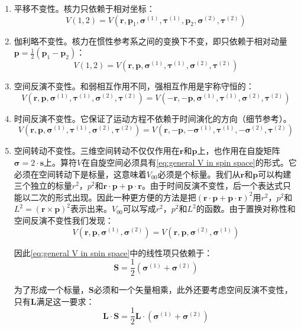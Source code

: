 \begin{enumerate}
\item 平移不变性。核力只依赖于相对坐标：
\[
V(1,2)=V(\boldsymbol{r},\boldsymbol{p}_{1},\boldsymbol{\sigma}^{(1)},\boldsymbol{\tau}^{(1)},\boldsymbol{p}_{2},\boldsymbol{\sigma}^{(2)},\boldsymbol{\tau}^{(2)})
\]
\item 伽利略不变性。核力在惯性参考系之间的变换下不变，即只依赖于相对动量$\boldsymbol{p}=\frac{1}{2}(\boldsymbol{p}_{1}-\boldsymbol{p}_{2})$：
\[
V(1,2)=V(\boldsymbol{r},\boldsymbol{p},\boldsymbol{\sigma}^{(1)},\boldsymbol{\tau}^{(1)},\boldsymbol{\sigma}^{(2)},\boldsymbol{\tau}^{(2)})
\]
\item 空间反演不变性。和弱相互作用不同，强相互作用是宇称守恒的：
\[
V(\boldsymbol{r},\boldsymbol{p},\boldsymbol{\sigma}^{(1)},\boldsymbol{\tau}^{(1)},\boldsymbol{\sigma}^{(2)},\boldsymbol{\tau}^{(2)})=V(-\boldsymbol{r},-\boldsymbol{p},\boldsymbol{\sigma}^{(1)},\boldsymbol{\tau}^{(1)},\boldsymbol{\sigma}^{(2)},\boldsymbol{\tau}^{(2)})
\]
\item 时间反演不变性。它保证了运动方程不依赖于时间演化的方向（细节参考\cite{Me61}）。
\[
V(\boldsymbol{r},\boldsymbol{p},\boldsymbol{\sigma}^{(1)},\boldsymbol{\tau}^{(1)},\boldsymbol{\sigma}^{(2)},\boldsymbol{\tau}^{(2)})=V(\boldsymbol{r},-\boldsymbol{p},-\boldsymbol{\sigma}^{(1)},\boldsymbol{\tau}^{(1)},-\boldsymbol{\sigma}^{(2)},\boldsymbol{\tau}^{(2)})
\]
\item 空间转动不变性。三维空间转动不仅仅作用在$\boldsymbol{r}$和$\boldsymbol{p}$上，也作用在自旋矩阵$\boldsymbol{\sigma}=2\cdot\boldsymbol{s}$上。算符$V$在自旋空间必须具有\ref{eq:general V in spin space}的形式。它必须在空间转动下是标量，这意味着$V_{00}$必须是个标量。我们从$\boldsymbol{r}$和$\boldsymbol{p}$可以构建三个独立的标量$r^{2}$，$p^{2}$和$\boldsymbol{r}\cdot\boldsymbol{p}+\boldsymbol{p}\cdot\boldsymbol{r}$。由于时间反演不变性，后一个表达式只能以二次的形式出现。因此一种更方便的方法是把$(\boldsymbol{r}\cdot\boldsymbol{p}+\boldsymbol{p}\cdot\boldsymbol{r})^{2}$用$r^{2}$，$p^{2}$和$L^{2}=(\boldsymbol{r}\times\boldsymbol{p})^{2}$表示出来。$V_{00}$可以写成$r^{2}$，$p^{2}$和$L^{2}$的函数。由于置换对称性和空间反演不变性我们发现：
\[
V(\boldsymbol{r},\boldsymbol{p},\boldsymbol{\sigma}^{(1)},\boldsymbol{\sigma}^{(2)})=V(\boldsymbol{r},\boldsymbol{p},\boldsymbol{\sigma}^{(2)},\boldsymbol{\sigma}^{(1)})
\]

因此\ref{eq:general V in spin space}中的线性项只依赖于：
\[
\boldsymbol{S}=\frac{1}{2}(\boldsymbol{\sigma}^{(1)}+\boldsymbol{\sigma}^{(2)})
\]

为了形成一个标量，$\boldsymbol{S}$必须和一个矢量相乘，此外还要考虑空间反演不变性，只有$\boldsymbol{L}$满足这一要求：
\[
\boldsymbol{L}\cdot\boldsymbol{S}=\frac{1}{2}\boldsymbol{L}\cdot(\boldsymbol{\sigma}^{(1)}+\boldsymbol{\sigma}^{(2)})
\]


\end{enumerate}

